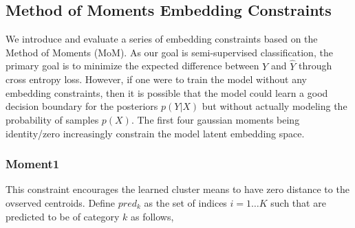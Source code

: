 \documentclass[10pt,twocolumn,letterpaper]{article}
\begin{document}

\subsection{Method of Moments Embedding Constraints}

We introduce and evaluate a series of embedding constraints based on the Method of Moments (MoM). 
As our goal is semi-supervised classification, the primary goal is to minimize the expected difference between $Y$ and $\hat{Y}$ through cross entropy loss. 
However, if one were to train the model without any embedding constraints, then it is possible that the model could learn a good decision boundary for the posteriors $p(Y|X)$ but without actually modeling the probability of samples $p(X)$.
The first four gaussian moments being identity/zero increasingly constrain the model latent embedding space. 

%

\subsubsection{Moment1}

This constraint encourages the learned cluster means to have zero distance to the ovserved centroids. 
Define $pred_k$ as the set of indices $i=1 \dots K$ such that are predicted to be of category $k$ as follows,
\end{document}
